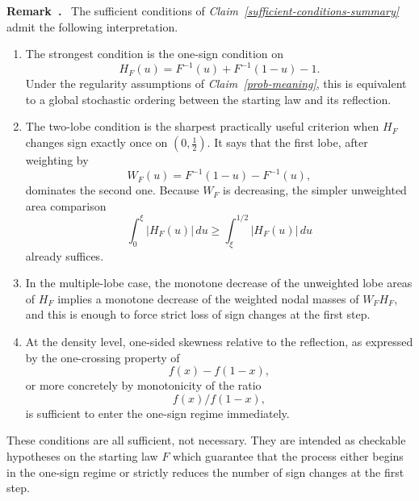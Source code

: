 \documentclass[onecolumn]{article}
\newenvironment{remark}{  \refstepcounter{theorem}  \par\medskip\noindent\textbf{Remark~\thetheorem.}\rmfamily\ }{\par\medskip}
\begin{document}
\begin{remark}
\label{sufficient-conditions-discussion} The sufficient conditions of 
\textit{Claim~\ref{sufficient-conditions-summary}} admit the following
interpretation.

\begin{enumerate}
\item The strongest condition is the one-sign condition on 
\begin{equation}
H_{F}(u)=F^{-1}(u)+F^{-1}(1-u)-1.  \label{1431}
\end{equation}%
Under the regularity assumptions of \textit{Claim~\ref{prob-meaning}}, this
is equivalent to a global stochastic ordering between the starting law and
its reflection.

\item The two-lobe condition is the sharpest practically useful criterion
when $H_{F}$ changes sign exactly once on $(0,\tfrac{1}{2})$. It says that
the first lobe, after weighting by 
\begin{equation}
W_{F}(u)=F^{-1}(1-u)-F^{-1}(u),  \label{1432}
\end{equation}%
dominates the second one. Because $W_{F}$ is decreasing, the simpler
unweighted area comparison 
\begin{equation}
\int_{0}^{\xi }|H_{F}(u)|\,du\geq \int_{\xi }^{1/2}|H_{F}(u)|\,du
\label{1433}
\end{equation}%
already suffices.

\item In the multiple-lobe case, the monotone decrease of the unweighted
lobe areas of $H_{F}$ implies a monotone decrease of the weighted nodal
masses of $W_{F}H_{F}$, and this is enough to force strict loss of sign
changes at the first step.

\item At the density level, one-sided skewness relative to the reflection,
as expressed by the one-crossing property of 
\begin{equation}
f(x)-f(1-x),  \label{1434}
\end{equation}%
or more concretely by monotonicity of the ratio 
\begin{equation}
f(x)/f(1-x),  \label{1435}
\end{equation}%
is sufficient to enter the one-sign regime immediately.
\end{enumerate}

These conditions are all sufficient, not necessary. They are intended as
checkable hypotheses on the starting law $F$ which guarantee that the
process either begins in the one-sign regime or strictly reduces the number
of sign changes at the first step.
\end{remark}
\end{document}
